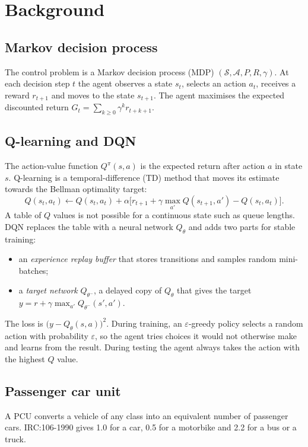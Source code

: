 \documentclass[12pt,a4paper]{article}
\begin{document}
\section{Background}
\subsection{Markov decision process}
The control problem is a Markov decision process (MDP) $(\mathcal{S},\mathcal{A},P,R,\gamma)$.
At each decision step $t$ the agent observes a state $s_t$, selects an action $a_t$,
receives a reward $r_{t+1}$ and moves to the state $s_{t+1}$. The agent maximises the expected
discounted return $G_t=\sum_{k\ge 0}\gamma^k r_{t+k+1}$.

\subsection{Q-learning and DQN}
The action-value function $Q^\pi(s,a)$ is the expected return after action $a$ in state $s$.
Q-learning is a temporal-difference (TD) method that moves its estimate towards the Bellman
optimality target:
\begin{equation}
Q(s_t,a_t) \leftarrow Q(s_t,a_t) + \alpha\Big[r_{t+1} + \gamma \max_{a'} Q(s_{t+1},a') - Q(s_t,a_t)\Big].
\end{equation}
A table of $Q$ values is not possible for a continuous state such as queue lengths.
DQN replaces the table with a neural network $Q_\theta$ and adds two parts
for stable training:
\begin{itemize}
  \item an \emph{experience replay buffer} that stores transitions and samples random mini-batches;
  \item a \emph{target network} $Q_{\theta^-}$, a delayed copy of $Q_\theta$ that gives the target
        $y=r+\gamma\max_{a'}Q_{\theta^-}(s',a')$.
\end{itemize}
The loss is $\big(y-Q_\theta(s,a)\big)^2$. During training, an $\varepsilon$-greedy policy selects
a random action with probability $\varepsilon$, so the agent tries choices it would not otherwise
make and learns from the result. During testing the agent always takes the action with the highest
$Q$ value.

\subsection{Passenger car unit}
A PCU converts a vehicle of any class into an equivalent number of passenger cars.
IRC:106-1990 gives 1.0 for a car, 0.5 for a motorbike and 2.2 for a bus or a truck.
\end{document}
